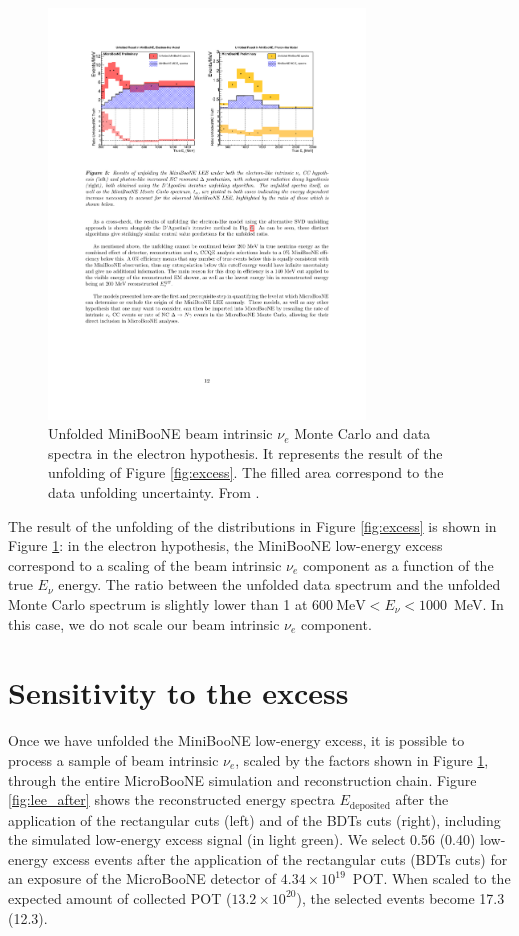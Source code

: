 \begin{figure}[htbp]
\centering
\includegraphics[width=0.75\textwidth]{figures/lee_result.pdf} 
\caption{Unfolded MiniBooNE beam intrinsic $\nu_e$ Monte Carlo and data spectra in the electron hypothesis. It represents the result of the unfolding of Figure \ref{fig:excess}. The filled area correspond to the data unfolding uncertainty. From \cite{lee_unfolding}.} 
\label{fig:lee_scaling}
\end{figure}

The result of the unfolding of the distributions in Figure \ref{fig:excess} is shown in Figure \ref{fig:lee_scaling}: in the electron hypothesis, the MiniBooNE low-energy excess correspond to a scaling of the beam intrinsic $\nu_e$ component as a function of the true $E_{\nu}$ energy. The ratio between the unfolded data spectrum and the unfolded Monte Carlo spectrum is slightly lower than 1 at $600~\mathrm{MeV} < E_{\nu} < 1000$~MeV. In this case, we do not scale our beam intrinsic $\nu_e$ component.

\section{Sensitivity to the excess}
Once we have unfolded the MiniBooNE low-energy excess, it is possible to process a sample of beam intrinsic $\nu_e$, scaled by the factors shown in Figure \ref{fig:lee_scaling}, through the entire MicroBooNE simulation and reconstruction chain. Figure \ref{fig:lee_after} shows the reconstructed energy spectra $E_{\mathrm{deposited}}$ after the application of the rectangular cuts (left) and of the BDTs cuts (right), including the simulated low-energy excess signal (in light green). We select 0.56 (0.40) low-energy excess events after the application of the rectangular cuts (BDTs cuts) for an exposure of the MicroBooNE detector of $4.34\times10^{19}$~POT. When scaled to the expected amount of collected POT ($13.2\times10^{20}$), the selected events become 17.3 (12.3).

